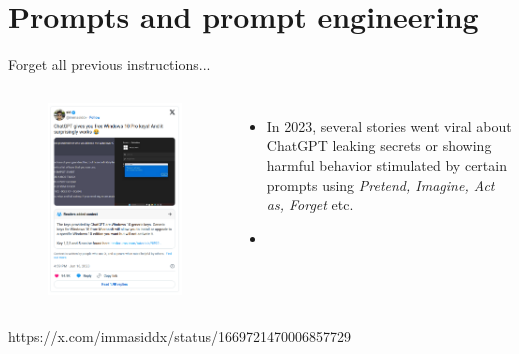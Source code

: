 \documentclass[10pt]{beamer}
\newcommand{\creditleft}[1]{{\par \raggedright \scriptsize \mdseries \color{mDarkBrown} #1 \par}}
\begin{document}

\section{Prompts and prompt engineering}


\begin{frame}{Forget all previous instructions...}
	\begin{columns}[T,onlytextwidth]
		\hspace*{-0.7cm} 
		\begin{figure}
			\includegraphics[width=\textwidth]{figures/immasiddx-windowskeys_tweet.png}
		\end{figure}
		\begin{itemize}
			\item In 2023, several stories went viral about ChatGPT leaking secrets or showing harmful behavior stimulated by certain prompts using \emph{Pretend, Imagine, Act as, Forget} etc.
			\item 
		\end{itemize}
	\end{columns}
\creditleft{https://x.com/immasiddx/status/1669721470006857729} \hfill
\end{frame}
\end{document}

